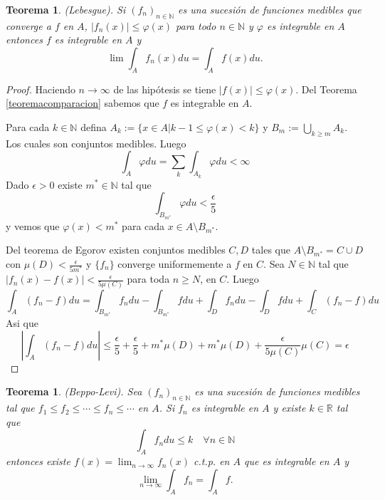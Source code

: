 \documentclass[twoside,12pt,a4 paper,openright]{book}
\newtheorem{teo}[claim]{Teorema}
\begin{document}
 
 
\begin{teo}
    (Lebesgue). Si $(f_n)_{n\in \mathbb N}$ es una sucesi\'on de funciones medibles que  converge a $f$ en $A$,  $|f_n(x)| \leq \varphi(x)$ para todo $n\in \mathbb N$ y $\varphi$ es integrable en $A$  entonces $f$ es integrable en $A$ y 
    $$\lim \int_A f_n(x) du = \int_Af(x)du.$$
\end{teo}
\begin{proof}
    Haciendo $n\to\infty$ de las hip\'otesis se tiene $|f(x)|\leq \varphi(x)$. Del Teorema \ref{teoremacomparacion} sabemos que  $f$ es integrable en $A$.
    
    

   Para cada $k\in \mathbb N$ defina  $A_k := \{x\in A | k-1\leq \varphi(x)< k\}$ y $\displaystyle B_m := \bigcup_{k\geq m} A_k$. Los cuales son conjuntos medibles.  
 Luego    $$\int_A \varphi du = \sum_k \int_{A_k} \varphi du < \infty$$
Dado $\epsilon>0$ existe $m^*\in \mathbb N$ tal que 
    $$\int_{B_{m^*}}\varphi du <\frac{\epsilon}{5} $$
y vemos que   $\varphi(x)<m^*$ para cada $x\in A\setminus B_{m^*}$. 
    
    Del  teorema de Egorov existen conjuntos medibles  $C,D$ tales que $A\setminus B_{m^*} = C\cup D$ con $\displaystyle\mu(D)<\frac{\epsilon}{ 5m^*}$ y $\{f_n\}$ converge uniformemente a $f$ en $C$.    Sea $N\in\mathbb N $ tal que $\displaystyle |f_n(x) - f(x)| < \frac{\epsilon}{5\mu(C)}$ para toda $n\geq N$, en $C$. Luego
    $$\int_A(f_n - f)du = \int_{B_{m^*}}f_ndu - \int_{B_{m^*}}fdu + \int_D f_n du- \int_D f du+ \int_C(f_n - f) du$$
    Asi que 
    $$\left|\int_A(f_n - f)du\right|\leq \frac{\epsilon}{5} + \frac{\epsilon}{5} + m^*\mu(D)+m^* \mu(D) + \frac{\epsilon}{5\mu(C)}\mu(C) = \epsilon$$
\end{proof}
\begin{teo}
    (Beppo-Levi). Sea $(f_n)_{n\in \mathbb N}$ es una sucesi\'on de funciones medibles tal que  $f_1\leq f_2\leq \cdots \leq f_n\leq \cdots$ en $A$. Si  $f_n$ es integrable en $A$ y existe $k\in \mathbb R$ tal que 
    $$\int_A f_n du \leq k \quad \forall n\in \mathbb N$$
entonces existe $\displaystyle f(x) = \lim_{n\to \infty} f_n(x)$ c.t.p. en $A$ que  es integrable en $A$ y 
    $$\lim_{n\to\infty} \int_A f_n = \int_A f.$$
\end{teo}
\end{document}
